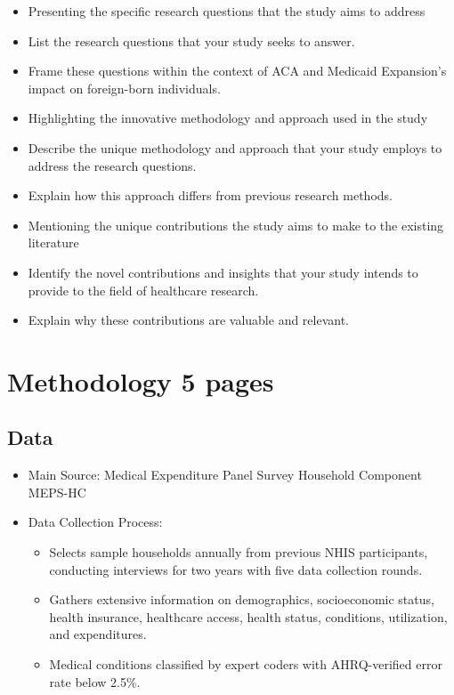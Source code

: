 \documentclass[10pt, oneside]{article}
\begin{document}
\begin{itemize}
\item Presenting the specific research questions that the study aims to address
\item List the research questions that your study seeks to answer.
\item Frame these questions within the context of ACA and Medicaid Expansion's impact on foreign-born individuals.
\item Highlighting the innovative methodology and approach used in the study
\item Describe the unique methodology and approach that your study employs to address the research questions.
\item Explain how this approach differs from previous research methods.
\item Mentioning the unique contributions the study aims to make to the existing literature
\item Identify the novel contributions and insights that your study intends to provide to the field of healthcare research.
\item Explain why these contributions are valuable and relevant.

\end{itemize}


\section{Methodology 5 pages}

\subsection{Data}
\begin{itemize}

\item Main Source: Medical Expenditure Panel Survey Household Component MEPS-HC
\item Data Collection Process: 
\begin{itemize}
    \item Selects sample households annually from previous NHIS participants, conducting interviews for two years with five data collection rounds.
    \item Gathers extensive information on demographics, socioeconomic status, health insurance, healthcare access, health status, conditions, utilization, and expenditures.
    \item Medical conditions classified by expert coders with AHRQ-verified error rate below 2.5\%.
\end{itemize}
\end{itemize}
\end{document}
